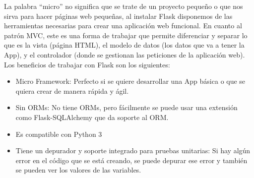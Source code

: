 \begin{description}
        La palabra “micro” no significa que se trate de un proyecto pequeño o que nos sirva para hacer páginas web pequeñas, al instalar Flask disponemos de las herramientas necesarias para crear una aplicación web funcional.
\newline        
En cuanto al patrón MVC, este es una forma de trabajar que permite diferenciar y separar lo que es la vista (página HTML), el modelo de datos (los datos que va a tener la App), y el controlador (donde se gestionan las peticiones de la aplicación web). \cite{sb}
Los beneficios de trabajar con Flask son los siguientes:
\begin{itemize}
    \item Micro Framework: Perfecto si se quiere desarrollar una App básica o que se quiera crear de manera rápida y ágil.
    \item Sin ORMs: No tiene ORMs, pero fácilmente se puede usar una extensión como Flask-SQLAlchemy que da soporte al ORM.
    \item Es compatible con Python 3
    \item Tiene un depurador y soporte integrado para pruebas unitarias: Si hay algún error en el código que se está creando, se puede depurar ese error y también se pueden ver los valores de las variables.
\end{itemize}
        
    \end{description}


